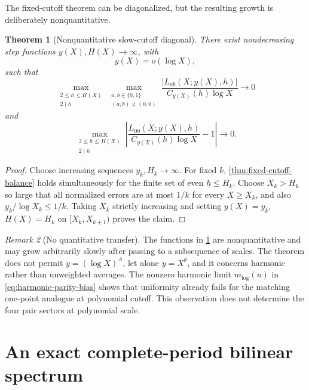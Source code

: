 \documentclass[11pt]{article}
\newtheorem{theorem}{Theorem}[section]
\theoremstyle{definition}
\theoremstyle{remark}
\newtheorem{remark}[theorem]{Remark}
\begin{document}
The fixed-cutoff theorem can be diagonalized, but the resulting growth is deliberately nonquantitative.

\begin{theorem}[Nonquantitative slow-cutoff diagonal]\label{thm:slow-diagonal}
There exist nondecreasing step functions $y(X),H(X)\to\infty$, with
\begin{equation}\label{eq:slow-cutoff-size}
 y(X)=o(\log X),
\end{equation}
such that
\begin{equation}\label{eq:slow-diagonal-twists}
 \max_{\substack{2\le h\le H(X)\\2\mid h}}
 \max_{\substack{a,b\in\{0,1\}\\(a,b)\ne(0,0)}}
 \frac{|L_{ab}(X;y(X),h)|}{C_{y(X)}(h)\log X}
 \longrightarrow0
\end{equation}
and
\begin{equation}\label{eq:slow-diagonal-mass}
 \max_{\substack{2\le h\le H(X)\\2\mid h}}
 \left|
 \frac{L_{00}(X;y(X),h)}{C_{y(X)}(h)\log X}-1
 \right|\longrightarrow0.
\end{equation}
\end{theorem}

\begin{proof}
Choose increasing sequences $y_k,H_k\to\infty$.  For fixed $k$, \cref{thm:fixed-cutoff-balance} holds simultaneously for the finite set of even $h\le H_k$.  Choose $X_k>H_k$ so large that all normalized errors are at most $1/k$ for every $X\ge X_k$, and also $y_k/\log X_k\le1/k$.  Taking $X_k$ strictly increasing and setting $y(X)=y_k$, $H(X)=H_k$ on $[X_k,X_{k+1})$ proves the claim.
\end{proof}

\begin{remark}[No quantitative transfer]\label{rem:no-uniform-chowla-transfer}
The functions in \cref{thm:slow-diagonal} are nonquantitative and may grow arbitrarily slowly after passing to a subsequence of scales.  The theorem does not permit $y=(\log X)^A$, let alone $y=X^\theta$, and it concerns harmonic rather than unweighted averages.  The nonzero harmonic limit $m_{\log}(u)$ in \eqref{eq:harmonic-parity-bias} shows that uniformity already fails for the matching one-point analogue at polynomial cutoff.  This observation does not determine the four pair sectors at polynomial scale.
\end{remark}

\section{An exact complete-period bilinear spectrum}\label{sec:bilinear-spectrum}
\end{document}
